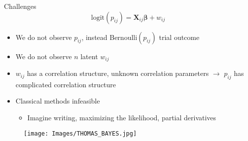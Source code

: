 \documentclass{beamer}
\begin{document}
\begin{frame}{Challenges} %
$$ \text{logit}(p_{ij}) = \pmb{X}_{ij} \pmb{\beta} + w_{ij}$$
\begin{itemize}
\addtolength{\itemsep}{0.5\baselineskip}
\item We do not observe $p_{ij}$, instead Bernoulli$(p_{ij})$ trial outcome
\item We do not observe $n$ latent $w_{ij}$
\item $w_{ij}$ has a correlation structure, unknown correlation parameters $\rightarrow$ $p_{ij}$ has complicated correlation structure

\item Classical methods infeasible
  \begin{itemize}
  \item Imagine writing, maximizing the likelihood, partial derivatives
  \end{itemize}
\end{itemize}

  \begin{figure}[H]
	\centering
	\texttt{[image: Images/THOMAS\_BAYES.jpg]}
	\end{figure}

\end{frame}
\end{document}
